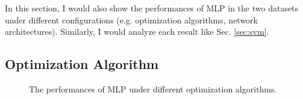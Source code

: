 \documentclass[12pt,a4paper]{article}
\theoremstyle{definition}
\begin{document}
In this section, I would also show the performances of MLP in the two datasets under different configurations (e.g. optimization algorithms, network architectures). Similarly, I would analyze each result like Sec. \ref{sec:svm}.

\subsection{Optimization Algorithm}

\begin{figure}[H]
	\centering
	\caption{The performances of MLP under different optimization algorithms.}
	\label{fig:mlp-optimizer}
\end{figure}
\end{document}
